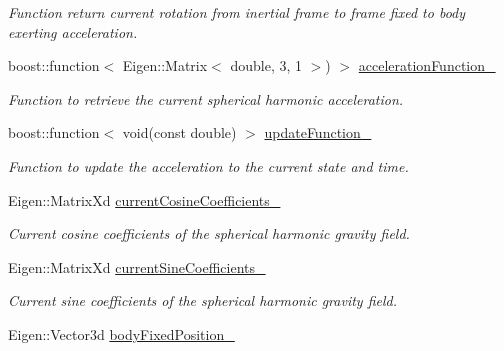 \begin{DoxyCompactItemize}
\begin{DoxyCompactList}\small\item\em Function return current rotation from inertial frame to frame fixed to body exerting acceleration. \end{DoxyCompactList}\item 
boost\+::function$<$ Eigen\+::\+Matrix$<$ double, 3, 1 $>$) $>$ \hyperlink{classtudat_1_1acceleration__partials_1_1SphericalHarmonicsGravityPartial_ab7183d1c6d8306a7ea1b8890aed38be2}{acceleration\+Function\+\_\+}\hypertarget{classtudat_1_1acceleration__partials_1_1SphericalHarmonicsGravityPartial_ab7183d1c6d8306a7ea1b8890aed38be2}{}\label{classtudat_1_1acceleration__partials_1_1SphericalHarmonicsGravityPartial_ab7183d1c6d8306a7ea1b8890aed38be2}

\begin{DoxyCompactList}\small\item\em Function to retrieve the current spherical harmonic acceleration. \end{DoxyCompactList}\item 
boost\+::function$<$ void(const double) $>$ \hyperlink{classtudat_1_1acceleration__partials_1_1SphericalHarmonicsGravityPartial_a3e659d0870f55c89d6c9254b43c4f21a}{update\+Function\+\_\+}
\begin{DoxyCompactList}\small\item\em Function to update the acceleration to the current state and time. \end{DoxyCompactList}\item 
Eigen\+::\+Matrix\+Xd \hyperlink{classtudat_1_1acceleration__partials_1_1SphericalHarmonicsGravityPartial_a5cf1f88dd030daa8efe9caeb7fae3cd9}{current\+Cosine\+Coefficients\+\_\+}
\begin{DoxyCompactList}\small\item\em Current cosine coefficients of the spherical harmonic gravity field. \end{DoxyCompactList}\item 
Eigen\+::\+Matrix\+Xd \hyperlink{classtudat_1_1acceleration__partials_1_1SphericalHarmonicsGravityPartial_a61efd1799c484094e1f2a3309817cee2}{current\+Sine\+Coefficients\+\_\+}
\begin{DoxyCompactList}\small\item\em Current sine coefficients of the spherical harmonic gravity field. \end{DoxyCompactList}\item 
Eigen\+::\+Vector3d \hyperlink{classtudat_1_1acceleration__partials_1_1SphericalHarmonicsGravityPartial_a96f617d424d3108f5fe63163309f987b}{body\+Fixed\+Position\+\_\+}

\end{DoxyCompactItemize}

